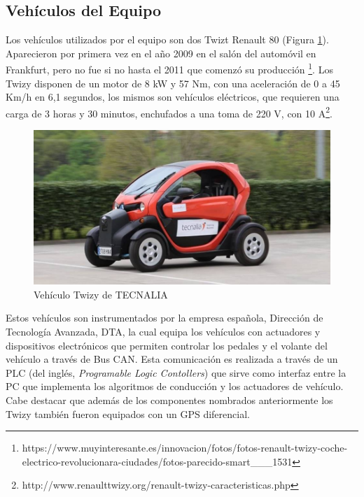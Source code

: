 \subsection{Vehículos del Equipo}
Los vehículos utilizados por el equipo son dos Twizt Renault 80 (Figura \ref{fig:twizy}). Aparecieron por primera vez en el año 2009 en el salón del automóvil en Frankfurt, pero no fue si no hasta el 2011 que comenzó su producción \footnote{https://www.muyinteresante.es/innovacion/fotos/fotos-renault-twizy-coche-electrico-revolucionara-ciudades/fotos-parecido-smart\_\_\_1531}. Los Twizy disponen de un motor de 8 kW y 57 Nm, con una aceleración de 0 a 45 Km/h en 6,1 segundos, los mismos son vehículos eléctricos, que requieren una carga de 3 horas y 30 minutos, enchufados a una toma de 220 V, con 10 A\footnote{ http://www.renaulttwizy.org/renault-twizy-caracteristicas.php}.\\
\begin{figure}[!h]
	\centering
		\includegraphics[scale=0.5]{Imagenes/twizy}
		\caption{Vehículo Twizy de TECNALIA}
		\label{fig:twizy}
	\end{figure}	  
\par Estos vehículos son instrumentados por la empresa española, Dirección de Tecnología Avanzada, DTA, la cual equipa los vehículos con actuadores y dispositivos electrónicos que permiten controlar los pedales y el volante del vehículo a través de Bus CAN. Esta comunicación es realizada a través de un PLC (del inglés, \textit{Programable Logic Contollers}) que sirve como interfaz entre la PC que implementa los algoritmos de conducción y los actuadores de vehículo. Cabe destacar que además de los componentes nombrados anteriormente los Twizy también fueron equipados con un GPS diferencial.\\  

